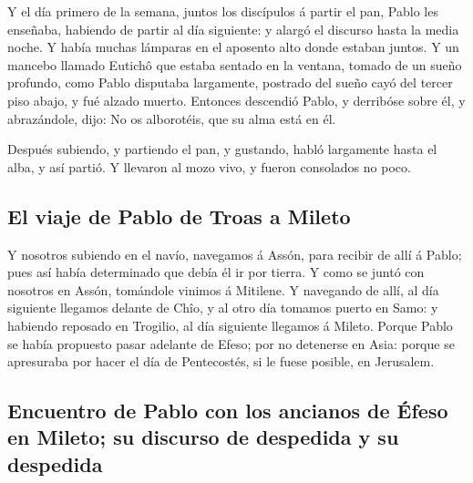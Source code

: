  Y el día primero de la semana, juntos los discípulos á
partir el pan, Pablo les enseñaba, habiendo de partir al día siguiente:
y alargó el discurso hasta la media noche.  Y había muchas
lámparas en el aposento alto donde estaban juntos.  Y un
mancebo llamado Eutichô que estaba sentado en la ventana, tomado de un
sueño profundo, como Pablo disputaba largamente, postrado del sueño cayó
del tercer piso abajo, y fué alzado muerto.  Entonces
descendió Pablo, y derribóse sobre él, y abrazándole, dijo: No os
alborotéis, que su alma está en él.

 Después subiendo, y partiendo el pan, y gustando, habló
largamente hasta el alba, y así partió.  Y llevaron al mozo
vivo, y fueron consolados no poco.

\hypertarget{el-viaje-de-pablo-de-troas-a-mileto}{%
\subsection{El viaje de Pablo de Troas a
Mileto}\label{el-viaje-de-pablo-de-troas-a-mileto}}

 Y nosotros subiendo en el navío, navegamos á Assón, para
recibir de allí á Pablo; pues así había determinado que debía él ir por
tierra.  Y como se juntó con nosotros en Assón, tomándole
vinimos á Mitilene.  Y navegando de allí, al día siguiente
llegamos delante de Chîo, y al otro día tomamos puerto en Samo: y
habiendo reposado en Trogilio, al día siguiente llegamos á Mileto.
 Porque Pablo se había propuesto pasar adelante de Efeso;
por no detenerse en Asia: porque se apresuraba por hacer el día de
Pentecostés, si le fuese posible, en Jerusalem.

\hypertarget{encuentro-de-pablo-con-los-ancianos-de-uxe9feso-en-mileto-su-discurso-de-despedida-y-su-despedida}{%
\subsection{Encuentro de Pablo con los ancianos de Éfeso en Mileto; su
discurso de despedida y su
despedida}\label{encuentro-de-pablo-con-los-ancianos-de-uxe9feso-en-mileto-su-discurso-de-despedida-y-su-despedida}}

